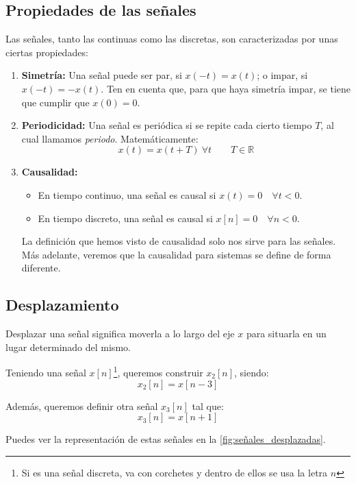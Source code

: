 \documentclass[a4paper]{book}
\begin{document}
\subsection{Propiedades de las señales}
Las señales, tanto las continuas como las discretas, son caracterizadas por unas ciertas propiedades:
\begin{enumerate}
	\item \textbf{Simetría:} Una señal puede ser par, si $x(-t) = x(t)$; o impar, si $x(-t) = -x(t)$. Ten en cuenta que, para que haya simetría impar, se tiene que cumplir que $x(0) = 0$.
	\item \textbf{Periodicidad:} Una señal es periódica si se repite cada cierto tiempo $T$, al cual llamamos \emph{periodo}. Matemáticamente: \[x(t) = x(t+T) \ \forall t \qquad T \in \mathbb{R}\]
	\item \textbf{Causalidad:} \begin{itemize}
		      \item En tiempo continuo, una señal es causal si $x(t) = 0 \quad \forall t < 0$.
		      \item En tiempo discreto, una señal es causal si $x[n] = 0 \quad \forall n<0$.
	      \end{itemize}
	      \begin{nota}
		      La definición que hemos visto de causalidad solo nos sirve para las señales. Más adelante, veremos que la causalidad para sistemas se define de forma diferente.
	      \end{nota}
\end{enumerate}




\subsection{Desplazamiento}
Desplazar una señal significa moverla a lo largo del eje $x$ para situarla en un lugar determinado del mismo.

\begin{ejemplo}
	Teniendo una señal $x[n]$\footnote{Si es una señal discreta, va con corchetes y dentro de ellos se usa la letra $n$}, queremos construir $x_2[n]$, siendo: \[x_2[n] = x[n-3]\]
\end{ejemplo}

\begin{ejemplo}
	Además, queremos definir otra señal $x_3[n]$ tal que: \[x_3[n] = x[n+1]\]
\end{ejemplo}

Puedes ver la representación de estas señales en la \autoref{fig:señales_desplazadas}.
\end{document}
